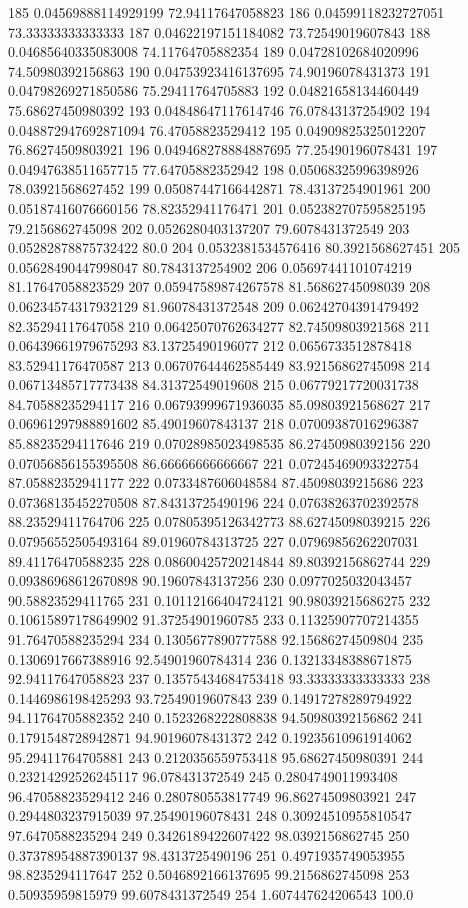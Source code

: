 {185 0.04569888114929199 72.94117647058823
186 0.04599118232727051 73.33333333333333
187 0.04622197151184082 73.72549019607843
188 0.04685640335083008 74.11764705882354
189 0.04728102684020996 74.50980392156863
190 0.04753923416137695 74.90196078431373
191 0.04798269271850586 75.29411764705883
192 0.04821658134460449 75.68627450980392
193 0.04848647117614746 76.07843137254902
194 0.048872947692871094 76.47058823529412
195 0.04909825325012207 76.86274509803921
196 0.049468278884887695 77.25490196078431
197 0.04947638511657715 77.64705882352942
198 0.05068325996398926 78.03921568627452
199 0.05087447166442871 78.43137254901961
200 0.05187416076660156 78.82352941176471
201 0.052382707595825195 79.2156862745098
202 0.0526280403137207 79.6078431372549
203 0.05282878875732422 80.0
204 0.0532381534576416 80.3921568627451
205 0.05628490447998047 80.7843137254902
206 0.05697441101074219 81.17647058823529
207 0.05947589874267578 81.56862745098039
208 0.06234574317932129 81.96078431372548
209 0.06242704391479492 82.35294117647058
210 0.06425070762634277 82.74509803921568
211 0.06439661979675293 83.13725490196077
212 0.0656733512878418 83.52941176470587
213 0.06707644462585449 83.92156862745098
214 0.06713485717773438 84.31372549019608
215 0.06779217720031738 84.70588235294117
216 0.06793999671936035 85.09803921568627
217 0.06961297988891602 85.49019607843137
218 0.07009387016296387 85.88235294117646
219 0.07028985023498535 86.27450980392156
220 0.07056856155395508 86.66666666666667
221 0.07245469093322754 87.05882352941177
222 0.0733487606048584 87.45098039215686
223 0.07368135452270508 87.84313725490196
224 0.07638263702392578 88.23529411764706
225 0.07805395126342773 88.62745098039215
226 0.07956552505493164 89.01960784313725
227 0.07969856262207031 89.41176470588235
228 0.08600425720214844 89.80392156862744
229 0.09386968612670898 90.19607843137256
230 0.0977025032043457 90.58823529411765
231 0.10112166404724121 90.98039215686275
232 0.10615897178649902 91.37254901960785
233 0.11325907707214355 91.76470588235294
234 0.1305677890777588 92.15686274509804
235 0.1306917667388916 92.54901960784314
236 0.13213348388671875 92.94117647058823
237 0.13575434684753418 93.33333333333333
238 0.1446986198425293 93.72549019607843
239 0.14917278289794922 94.11764705882352
240 0.1523268222808838 94.50980392156862
241 0.1791548728942871 94.90196078431372
242 0.19235610961914062 95.29411764705881
243 0.2120356559753418 95.68627450980391
244 0.23214292526245117 96.078431372549
245 0.2804749011993408 96.47058823529412
246 0.280780553817749 96.86274509803921
247 0.2944803237915039 97.25490196078431
248 0.30924510955810547 97.6470588235294
249 0.3426189422607422 98.0392156862745
250 0.37378954887390137 98.4313725490196
251 0.4971935749053955 98.8235294117647
252 0.5046892166137695 99.2156862745098
253 0.50935959815979 99.6078431372549
254 1.607447624206543 100.0
}\tableexpivecdfrlactcridill
